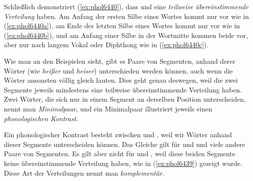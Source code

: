 Schließlich demonstriert (\ref{ex:phol6440}), dass \textipa{[s]} und \textipa{[z]} eine \textit{teilweise übereinstimmende Verteilung} haben.
Am Anfang der ersten Silbe eines Wortes kommt nur \textipa{[z]} vor wie in (\ref{ex:phol6440a}), am Ende der letzten Silbe eines Wortes kommt nur \textipa{[s]} vor wie in (\ref{ex:phol6440b}), und am Anfang einer Silbe in der Wortmitte kommen beide vor, \textipa{[z]} aber nur nach langem Vokal oder Diphthong wie in (\ref{ex:phol6440c}).

\begin{exe}
  \ex\label{ex:phol6438}
    \begin{xlist}
    \end{xlist}
  \ex\label{ex:phol6440}
    \begin{xlist}
    \end{xlist}
\end{exe}

Wie man an den Beispielen sieht, gibt es Paare von Segmenten, anhand derer Wörter (wie \textit{heißer} und \textit{heiser}) unterschieden werden können, auch wenn die Wörter ansonsten völlig gleich lauten.
Dies geht genau deswegen, weil die zwei Segmente jeweils mindestens eine teilweise übereinstimmende Verteilung haben.
Zwei Wörter, die sich nur in einem Segment an derselben Position unterscheiden, nennt man \textit{Minimalpaar}, und ein Minimalpaar illustriert jeweils einen \textit{phonologischen Kontrast}.


Ein phonologischer Kontrast besteht \zB zwischen \textipa{[t]} und \textipa{[k]}, weil wir Wörter anhand dieser Segmente unterscheiden können.
Das Gleiche gilt für \textipa{[s]} und \textipa{[z]} und viele andere Paare von Segmenten.
Es gilt aber nicht für \textipa{[h]} und \textipa{[N]}, weil diese beiden Segmente keine übereinstimmende Verteilung haben, wie in (\ref{ex:phol6439}) gezeigt wurde.
Diese Art der Verteilungen nennt man \textit{komplementär}.

